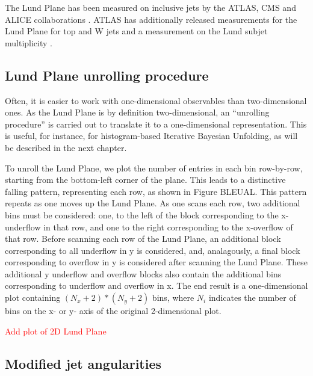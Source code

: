 \documentclass[10pt,a4paper]{book}
\newcommand{\todo}[1]{{\textcolor{red}{#1}}}
\begin{document}
The Lund Plane has been measured on inclusive jets by the ATLAS, CMS and ALICE collaborations \cite{ATLAS:2020bbn, CMS:2023lpp, ALICE:2021yet}. ATLAS has additionally released measurements for the Lund Plane for top and W jets \cite{ATLAS:2024dua} and a measurement on the Lund subjet multiplicity \cite{ATLAS:2024wrd}.

\subsection{Lund Plane unrolling procedure}

Often, it is easier to work with one-dimensional observables than two-dimensional ones. As the Lund Plane is by definition two-dimensional, an ``unrolling procedure'' is carried out to translate it to a one-dimensional representation. This is useful, for instance, for histogram-based Iterative Bayesian Unfolding, as will be described in the next chapter. 

To unroll the Lund Plane, we plot the number of entries in each bin row-by-row, starting from the bottom-left corner of the plane. This leads to a distinctive falling pattern, representing each row, as shown in Figure BLEUAL. This pattern repeats as one moves up the Lund Plane. As one scans each row, two additional bins must be considered: one, to the left of the block corresponding to the x-underflow in that row, and one to the right corresponding to the x-overflow of that row. Before scanning each row of the Lund Plane, an additional block corresponding to all underflow in y is considered, and, analagously, a final block corresponding to overflow in y is considered after scanning the Lund Plane. These additional y underflow and overflow blocks also contain the additional bins corresponding to underflow and overflow in x. The end result is a one-dimensional plot containing $(N_{x}+2)*(N_{y}+2)$ bins, where $N_{i}$ indicates the number of bins on the x- or y- axis of the original 2-dimensional plot.

\todo{Add plot of 2D Lund Plane}


 
\subsection{Modified jet angularities}
\label{angles}
\end{document}
